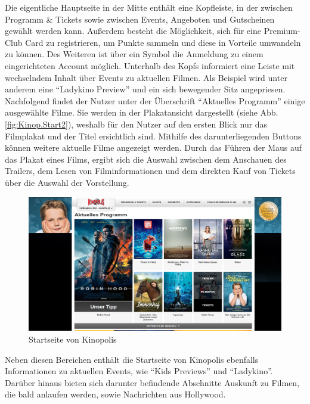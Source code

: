 	Die eigentliche Hauptseite in der Mitte enthält eine Kopfleiste, in der zwischen Programm \& Tickets sowie zwischen Events, Angeboten und Gutscheinen gewählt werden kann. Außerdem besteht die Möglichkeit, sich für eine Premium-Club Card zu registrieren, um Punkte sammeln und diese in Vorteile umwandeln zu können. Des Weiteren ist über ein Symbol die Anmeldung zu einem eingerichteten Account möglich. Unterhalb des Kopfs informiert eine Leiste mit wechselndem Inhalt über Events zu aktuellen Filmen. Als Beispiel wird unter anderem eine \enquote{Ladykino Preview} und ein sich bewegender Sitz angepriesen. 
	\\Nachfolgend findet der Nutzer unter der Überschrift \enquote{Aktuelles Programm} einige ausgewählte Filme. Sie werden in der Plakatansicht dargestellt (siehe Abb. \vref{fig:Kinop.Start2}), weshalb für den Nutzer auf den ersten Blick nur das Filmplakat und der Titel ersichtlich sind. Mithilfe des darunterliegenden Buttons können weitere aktuelle Filme angezeigt werden. Durch das Führen der Maus auf das Plakat eines Films, ergibt sich die Auswahl zwischen dem Anschauen des Trailers, dem Lesen von Filminformationen und dem direkten Kauf von Tickets über die Auswahl der Vorstellung.
	\begin{figure}
		\centering 
		\includegraphics[scale=0.38]{img/Kinopolis_MA_Start2.png}
		\captionsetup{format=hang}
		\centering\caption[Startseite von Kinopolis Viernheim]{\label{fig:Kinop.Start2}Startseite von Kinopolis\footnotemark}
	\end{figure}
	Neben diesen Bereichen enthält die Startseite von Kinopolis ebenfalls Informationen zu aktuellen Events, wie \enquote{Kids Previews} und \enquote{Ladykino}. Darüber hinaus bieten sich darunter befindende Abschnitte Auskunft zu Filmen, die bald anlaufen werden, sowie Nachrichten aus Hollywood. 
	
